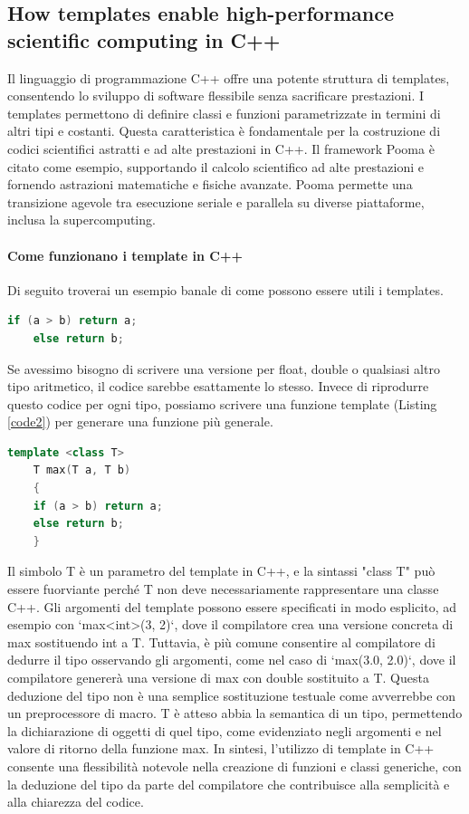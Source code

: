 \documentclass[11pt]{article}
\begin{document}
\begin{multicols*}{2}[\columnsep=1cm]
\section{How templates enable high-performance scientific computing in C++}
    Il linguaggio di programmazione C++ offre una potente struttura di templates, consentendo lo sviluppo di software flessibile senza sacrificare prestazioni. I templates permettono di definire classi e funzioni parametrizzate in termini di altri tipi e costanti. Questa caratteristica è fondamentale per la costruzione di codici scientifici astratti e ad alte prestazioni in C++. Il framework Pooma è citato come esempio, supportando il calcolo scientifico ad alte prestazioni e fornendo astrazioni matematiche e fisiche avanzate. 
    Pooma permette una transizione agevole tra esecuzione seriale e parallela su diverse piattaforme, inclusa la supercomputing.
    \paragraph{Come funzionano i template in C++}
    Di seguito troverai un esempio banale di come possono essere utili i templates.
    \begin{lstlisting}[language=C++, label=code1, caption={Max function without template}]
    if (a > b) return a;
    else return b;
    \end{lstlisting}
    Se avessimo bisogno di scrivere una versione per float, double o qualsiasi altro tipo aritmetico, il codice sarebbe esattamente lo stesso. Invece di riprodurre questo codice per ogni tipo, possiamo scrivere una funzione template (Listing \ref{code2}) per generare una funzione più generale.
    
    \begin{lstlisting}[language=C++, label=code2, caption={Max function with template}]
    template <class T>
    T max(T a, T b)
    {
    if (a > b) return a;
    else return b;
    }
    \end{lstlisting}
    
    Il simbolo T è un parametro del template in C++, e la sintassi "class T" può essere fuorviante perché T non deve necessariamente rappresentare una classe C++. Gli argomenti del template possono essere specificati in modo esplicito, ad esempio con `max<int>(3, 2)`, dove il compilatore crea una versione concreta di max sostituendo int a T. Tuttavia, è più comune consentire al compilatore di dedurre il tipo osservando gli argomenti, come nel caso di `max(3.0, 2.0)`, dove il compilatore genererà una versione di max con double sostituito a T.
    Questa deduzione del tipo non è una semplice sostituzione testuale come avverrebbe con un preprocessore di macro. T è atteso abbia la semantica di un tipo, permettendo la dichiarazione di oggetti di quel tipo, come evidenziato negli argomenti e nel valore di ritorno della funzione max. In sintesi, l'utilizzo di template in C++ consente una flessibilità notevole nella creazione di funzioni e classi generiche, con la deduzione del tipo da parte del compilatore che contribuisce alla semplicità e alla chiarezza del codice.


\end{multicols*}
\end{document}
